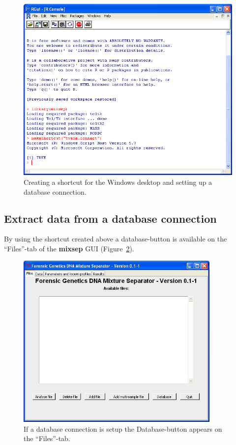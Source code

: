 \documentclass[a4paper,11pt]{article}
\newcommand{\pkg}[1]{\textbf{#1}}
\begin{document}
\begin{figure}[!h]
  \centering
  \includegraphics[width=12cm]{shortcut_db}
  \caption{\label{fig:shortcut_db}Creating a shortcut for the Windows
    desktop and setting up a database connection.}
\end{figure}

\subsection{Extract data from a database connection}
\label{sec:extract-db}

By using the shortcut created above a database-button is available on
the ``Files''-tab of the \pkg{mixsep} GUI (Figure~\ref{fig:front}).

\begin{figure}[!h]
  \centering
  \includegraphics[width=10cm]{front}
  \caption{\label{fig:front}If a database connection is setup the
    Database-button appears on the ``Files''-tab.}
\end{figure}
\end{document}
